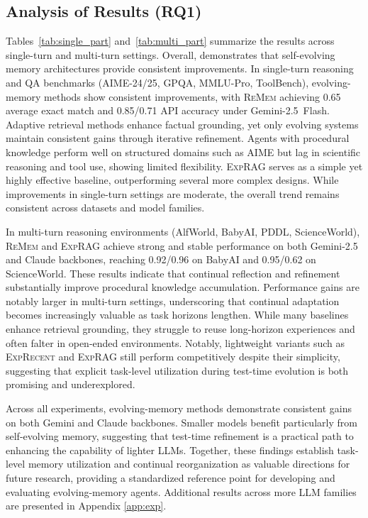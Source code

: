 \subsection{Analysis of Results (RQ1)}

Tables~\ref{tab:single_part} and~\ref{tab:multi_part} summarize the results across single-turn and multi-turn settings. 
Overall, \method demonstrates that self-evolving memory architectures provide consistent improvements. In single-turn reasoning and QA benchmarks (AIME-24/25, GPQA, MMLU-Pro, ToolBench), evolving-memory methods show consistent improvements, with \textsc{ReMem} achieving 0.65 average exact match and 0.85/0.71 API accuracy under Gemini-2.5~Flash. 
Adaptive retrieval methods enhance factual grounding, yet only evolving systems maintain consistent gains through iterative refinement. 
Agents with procedural knowledge perform well on structured domains such as AIME but lag in scientific reasoning and tool use, showing limited flexibility. \textsc{ExpRAG} serves as a simple yet highly effective baseline, outperforming several more complex designs.
While improvements in single-turn settings are moderate, the overall trend remains consistent across datasets and model families.



In multi-turn reasoning environments (AlfWorld, BabyAI, PDDL, ScienceWorld), \textsc{ReMem} and \textsc{ExpRAG} achieve strong and stable performance on both Gemini-2.5 and Claude backbones, reaching 0.92/0.96 on BabyAI and 0.95/0.62 on ScienceWorld.
These results indicate that continual reflection and refinement substantially improve procedural knowledge accumulation.
Performance gains are notably larger in multi-turn settings, underscoring that continual adaptation becomes increasingly valuable as task horizons lengthen. While many baselines enhance retrieval grounding, they struggle to reuse long-horizon experiences and often falter in open-ended environments. Notably, lightweight variants such as \textsc{ExpRecent} and \textsc{ExpRAG} still perform competitively despite their simplicity, suggesting that explicit task-level utilization during test-time evolution is both promising and underexplored.





Across all experiments, evolving-memory methods demonstrate consistent gains on both Gemini and Claude backbones. 
Smaller models benefit particularly from self-evolving memory, suggesting that test-time refinement is a practical path to enhancing the capability of lighter LLMs.
Together, these findings establish task-level memory utilization and continual reorganization as valuable directions for future research, providing a standardized reference point for developing and evaluating evolving-memory agents. Additional results across more LLM families are presented in Appendix \ref{app:exp}.


